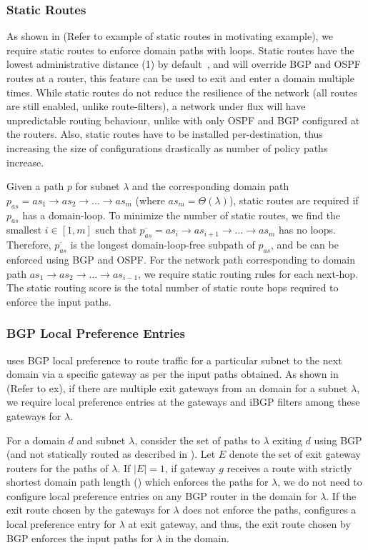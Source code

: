 \subsubsection{Static Routes} \label{sec:static}
As shown in \Cref{} (Refer to example of 
static routes in motivating example), we require static routes 
to enforce domain paths with loops. Static routes have the lowest 
administrative distance (1) by default~\cite{ad}, and will override BGP
and OSPF routes at a router, this feature can be used to 
exit and enter a domain multiple times. While static routes
do not reduce the resilience of the network (all routes are still
enabled, unlike route-filters), a network under flux will have
unpredictable routing behaviour, unlike with only OSPF and BGP
configured at the routers. 
Also, static routes have to be installed per-destination, thus increasing
the size of configurations drastically as number of policy paths increase.

Given a path $p$ for subnet $\lambda$ and 
the corresponding domain path $p_{as}
= as_1 \rightarrow as_2 \rightarrow \ldots \rightarrow as_m$ (where
$as_m = \Theta(\lambda)$), static
routes are required if $p_{as}$ has a domain-loop. 
To minimize
the number of static routes, we find 
the smallest $i \in [1,m]$ 
such that $\overline{p_{as}} = as_i \rightarrow as_{i+1}
\rightarrow \ldots \rightarrow as_m$ has no loops. 
Therefore, $\overline{p_{as}}$ is the longest domain-loop-free
subpath of $p_{as}$, and be can be enforced using BGP and OSPF. For the 
network path corresponding to domain path $as_1 \rightarrow as_2 
\rightarrow \ldots \rightarrow as_{i-1}$, we require static
routing rules for each next-hop. The static routing score
is the total number of static route hops required to enforce
the input paths.

\subsubsection{BGP Local Preference Entries}
\name uses BGP local preference to route traffic
for a particular subnet to the next domain via a specific 
gateway as per the input paths obtained. 
As shown in \Cref{} (Refer
to ex), if there are multiple exit gateways from an domain 
for a subnet $\lambda$, we require local preference entries at the 
gateways and iBGP filters among these gateways for $\lambda$.

For a domain $d$ and subnet $\lambda$, consider the set 
of paths to $\lambda$ exiting $d$ using BGP (and not statically
routed as described in ). Let $E$ denote the
set of exit gateway routers for the paths of $\lambda$. 
If $|E| = 1$, if gateway $g$ receives a route with 
strictly shortest domain path length () 
which enforces the paths
for $\lambda$, we do not need to configure local preference
entries on any BGP router in the domain for $\lambda$. If
the exit route chosen by the gateways for $\lambda$ does not 
enforce the paths, \name configures a local preference entry
for $\lambda$ at exit gateway, and thus, the exit route chosen
by BGP enforces the input paths for $\lambda$ in the domain.

